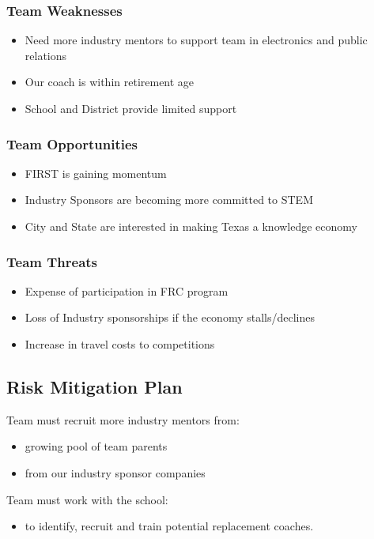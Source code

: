 \subsubsection{Team Weaknesses}
\begin{itemize}
	\item Need more industry mentors to support team in electronics and public relations
	\item Our coach is within retirement age
	\item School and District provide limited support
\end{itemize}

\subsubsection{Team Opportunities}
\begin{itemize}
	\item FIRST is gaining momentum
	\item Industry Sponsors are becoming more committed to STEM
	\item City and State are interested in making Texas a knowledge economy
\end{itemize}

\subsubsection{Team Threats}
\begin{itemize}
	\item Expense of participation in FRC program
	\item Loss of Industry sponsorships if the economy stalls/declines 
	\item Increase in travel costs to competitions
\end{itemize}

\subsection{Risk Mitigation Plan}
Team must recruit more industry mentors from:
\begin{itemize}
	\item growing pool of team parents
	\item from our industry sponsor companies
\end{itemize}

Team must work with the school:
\begin{itemize}
	\item to identify, recruit and train potential replacement coaches.
\end{itemize}


